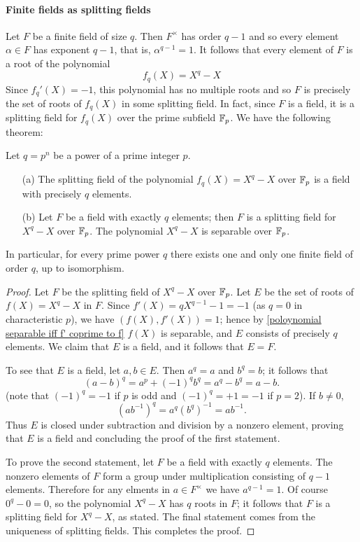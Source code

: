 \paragraph{Finite fields as splitting fields}
Let $F$ be a finite field of size $q$. Then $F^\times$ has order $q-1$ and so every element $\alpha\in F$ has exponent $q-1$, that is, $\alpha^{q-1}=1$. It follows that every element of $F$ is a root of the polynomial
\[f_q(X)=X^q-X\]
Since $f_q'(X)=-1$, this polynomial has no multiple roots and so $F$ is precisely the set of roots of $f_q(X)$ in some splitting field. In fact, since $F$ is a field, it is a splitting field for $f_q(X)$ over the prime subfield $\mathbb{F}_p$. We have the following theorem:
\begin{theorem}\label{finite field p^n order extension char}
Let $q=p^n$ be a power of a prime integer $p$.
\begin{itemize}
\item[(a)] The splitting field of the polynomial $f_q(X)=X^{q}-X$ over $\mathbb{F}_p$ is a field with precisely $q$ elements.
\item[(b)] Let $F$ be a field with exactly $q$ elements; then $F$ is a splitting field for $X^q-X$ over $\mathbb{F}_p$. The polynomial $X^q-X$ is separable over $\mathbb{F}_p$.
\end{itemize}
In particular, for every prime power $q$ there exists one and only one finite field of order $q$, up to isomorphism.
\end{theorem}
\begin{proof}
Let $F$ be the splitting field of $X^q-X$ over $\mathbb{F}_p$. Let $E$ be the set of roots of $f(X)=X^q-X$ in $F$. Since $f'(X)=qX^{q-1}-1=-1$ (as $q=0$ in characteristic $p$), we have $(f(X),f'(X))=1$; hence by \cref{poloynomial separable iff f' coprime to f} $f(X)$ is separable, and $E$ consists of precisely $q$ elements. We claim that $E$ is a field, and it follows that $E=F$.\par
To see that $E$ is a field, let $a,b\in E$. Then $a^q=a$ and $b^q=b$; it follows that
\[(a-b)^q=a^p+(-1)^qb^q=a^q-b^q=a-b.\]
(note that $(-1)^q=-1$ if $p$ is odd and $(-1)^q=+1=-1$ if $p=2$). If $b\neq0$,
\[(ab^{-1})^q=a^q(b^q)^{-1}=ab^{-1}.\]
Thus $E$ is closed under subtraction and division by a nonzero element, proving that $E$ is a field and concluding the proof of the first statement.\par
To prove the second statement, let $F$ be a field with exactly $q$ elements. The nonzero elements of $F$ form a group under multiplication consisting of $q-1$ elements. Therefore for any elments in $a\in F^\times$ we have $a^{q-1}=1$. Of course $0^q-0=0$, so the polynomial $X^q-X$ has $q$ roots in $F$; it follows that $F$ is a splitting field for $X^q-X$, as stated. The final statement comes from the uniqueness of splitting fields. This completes the proof.
\end{proof}
